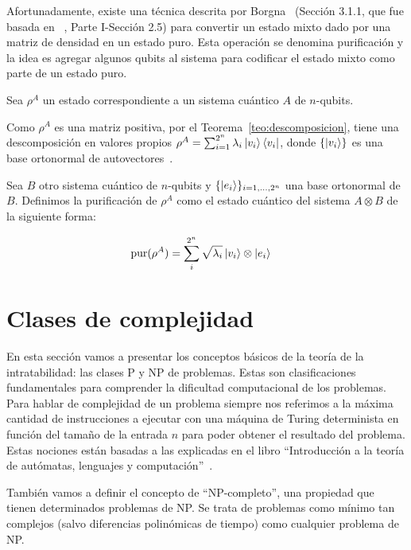 Afortunadamente, existe una técnica descrita por Borgna~\cite{agustin} (Sección 3.1.1, que fue basada en ~\cite{purification}, Parte I-Sección 2.5) para convertir un estado mixto dado por una matriz de densidad en un estado puro. Esta operación se denomina purificación y la idea es agregar algunos qubits al sistema para codificar el estado mixto como parte de un estado puro.




\begin{definicion}[Purificación]
\label{def:purificación}
Sea $\rho^A$ un estado correspondiente a un sistema cuántico $A$ de $n$-qubits.

Como $\rho^A$ es una matriz positiva, por el Teorema~\ref{teo:descomposicion}, tiene una descomposición en valores propios $\rho^A = \sum^{2^n}_{i=1} \lambda_i\ket{v_i}\bra{v_i}$, donde $\{\ket{v_i}\}$ es una base ortonormal de autovectores~\cite{algebra}.


Sea $B$ otro sistema cuántico de $n$-qubits y $\{\ket{e_i}\}_{i=1,\dots,2^n}$ una base ortonormal de $B$. Definimos la purificación de $\rho^A$ como el estado cuántico del sistema $A \otimes B$ de la siguiente forma:

\begin{align*}
\text{pur}(\rho^A) &= \sum_i^{2^n} \sqrt{\lambda_i}\ket{v_i}\otimes\ket{e_i}
\end{align*}

\end{definicion}

\section{Clases de complejidad}
En esta sección vamos a presentar los conceptos básicos de la teoría de la intratabilidad: las clases P y NP de problemas. Estas son clasificaciones fundamentales para comprender la dificultad computacional de los problemas. Para hablar de complejidad de un problema siempre nos referimos a la máxima cantidad de instrucciones a ejecutar con una máquina de Turing determinista en función del tamaño de la entrada $n$ para poder obtener el resultado del problema. Estas nociones están basadas a las explicadas en el libro ``Introducción a la teoría de autómatas, lenguajes y computación''~\cite{lenguajes}.

También vamos a definir el concepto de ``NP-completo'', una propiedad que tienen determinados problemas de NP. Se trata de problemas como mínimo tan complejos (salvo diferencias polinómicas de tiempo) como cualquier problema de NP.

